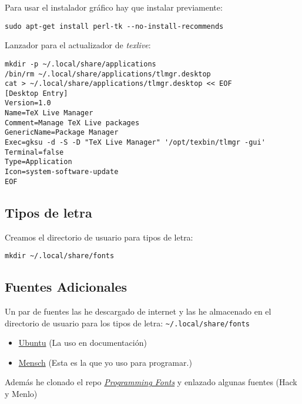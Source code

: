 \documentclass[
  12pt,
  spanish,
]{article}
\providecommand{\tightlist}{%
  \setlength{\itemsep}{0pt}\setlength{\parskip}{0pt}}
\begin{document}
Para usar el instalador gráfico hay que instalar previamente:

\begin{verbatim}
sudo apt-get install perl-tk --no-install-recommends
\end{verbatim}

Lanzador para el actualizador de \emph{texlive}:

\begin{verbatim}
mkdir -p ~/.local/share/applications
/bin/rm ~/.local/share/applications/tlmgr.desktop
cat > ~/.local/share/applications/tlmgr.desktop << EOF
[Desktop Entry]
Version=1.0
Name=TeX Live Manager
Comment=Manage TeX Live packages
GenericName=Package Manager
Exec=gksu -d -S -D "TeX Live Manager" '/opt/texbin/tlmgr -gui'
Terminal=false
Type=Application
Icon=system-software-update
EOF
\end{verbatim}

\hypertarget{tipos-de-letra}{%
\subsection{Tipos de letra}\label{tipos-de-letra}}

Creamos el directorio de usuario para tipos de letra:

\begin{verbatim}
mkdir ~/.local/share/fonts
\end{verbatim}

\hypertarget{fuentes-adicionales-1}{%
\subsection{Fuentes Adicionales}\label{fuentes-adicionales-1}}

Un par de fuentes las he descargado de internet y las he almacenado en
el directorio de usuario para los tipos de letra:
\texttt{\textasciitilde{}/.local/share/fonts}

\begin{itemize}
\tightlist
\item
  \href{https://design.ubuntu.com/font/}{Ubuntu} (La uso en
  documentación)
\item
  \href{https://robey.lag.net/downloads/mensch.ttf}{Mensch} (Esta es la
  que yo uso para programar.)
\end{itemize}

Además he clonado el repo
\href{https://github.com/ProgrammingFonts/ProgrammingFonts}{\emph{Programming
Fonts}} y enlazado algunas fuentes (Hack y Menlo)
\end{document}
